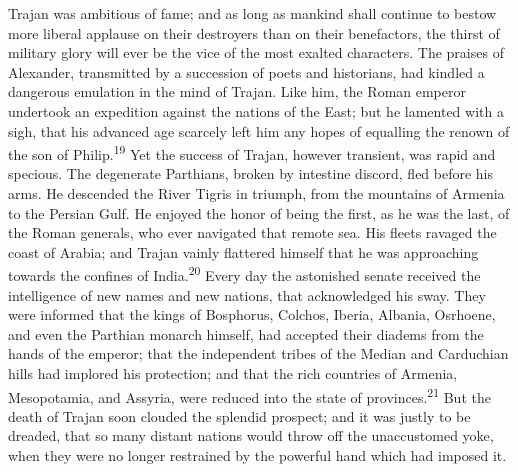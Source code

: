 



Trajan was ambitious of fame; and as long as mankind shall
continue to bestow more liberal applause on their destroyers than
on their benefactors, the thirst of military glory will ever be
the vice of the most exalted characters. The praises of
Alexander, transmitted by a succession of poets and historians,
had kindled a dangerous emulation in the mind of Trajan. Like
him, the Roman emperor undertook an expedition against the
nations of the East; but he lamented with a sigh, that his
advanced age scarcely left him any hopes of equalling the renown
of the son of Philip.\textsuperscript{19} Yet the success of Trajan, however
transient, was rapid and specious. The degenerate Parthians,
broken by intestine discord, fled before his arms. He descended
the River Tigris in triumph, from the mountains of Armenia to the
Persian Gulf. He enjoyed the honor of being the first, as he was
the last, of the Roman generals, who ever navigated that remote
sea. His fleets ravaged the coast of Arabia; and Trajan vainly
flattered himself that he was approaching towards the confines of
India.\textsuperscript{20} Every day the astonished senate received the
intelligence of new names and new nations, that acknowledged his
sway. They were informed that the kings of Bosphorus, Colchos,
Iberia, Albania, Osrhoene, and even the Parthian monarch himself,
had accepted their diadems from the hands of the emperor; that
the independent tribes of the Median and Carduchian hills had
implored his protection; and that the rich countries of Armenia,
Mesopotamia, and Assyria, were reduced into the state of
provinces.\textsuperscript{21} But the death of Trajan soon clouded the splendid
prospect; and it was justly to be dreaded, that so many distant
nations would throw off the unaccustomed yoke, when they were no
longer restrained by the powerful hand which had imposed it.


